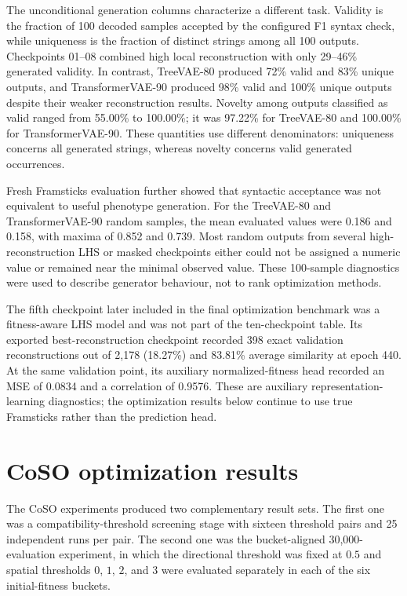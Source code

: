 The unconditional generation columns characterize a different task. Validity is the fraction of 100 decoded samples accepted by the configured F1 syntax check, while uniqueness is the fraction of distinct strings among all 100 outputs. Checkpoints 01--08 combined high local reconstruction with only 29--46\% generated validity. In contrast, TreeVAE-80 produced 72\% valid and 83\% unique outputs, and TransformerVAE-90 produced 98\% valid and 100\% unique outputs despite their weaker reconstruction results. Novelty among outputs classified as valid ranged from 55.00\% to 100.00\%; it was 97.22\% for TreeVAE-80 and 100.00\% for TransformerVAE-90. These quantities use different denominators: uniqueness concerns all generated strings, whereas novelty concerns valid generated occurrences.

Fresh Framsticks evaluation further showed that syntactic acceptance was not equivalent to useful phenotype generation. For the TreeVAE-80 and TransformerVAE-90 random samples, the mean evaluated \vertpos{} values were 0.186 and 0.158, with maxima of 0.852 and 0.739. Most random outputs from several high-reconstruction LHS or masked checkpoints either could not be assigned a numeric value or remained near the minimal observed value. These 100-sample diagnostics were used to describe generator behaviour, not to rank optimization methods.

The fifth checkpoint later included in the final optimization benchmark was a fitness-aware LHS model and was not part of the ten-checkpoint table. Its exported best-reconstruction checkpoint recorded 398 exact validation reconstructions out of 2,178 (18.27\%) and 83.81\% average similarity at epoch 440. At the same validation point, its auxiliary normalized-fitness head recorded an MSE of 0.0834 and a correlation of 0.9576. These are auxiliary representation-learning diagnostics; the optimization results below continue to use true Framsticks \vertpos{} rather than the prediction head.

\section{CoSO optimization results}
\label{sec:CoSO optimization results}

The CoSO experiments produced two complementary result sets. The first one was a compatibility-threshold screening stage with sixteen threshold pairs and 25 independent runs per pair. The second one was the bucket-aligned 30,000-evaluation experiment, in which the directional threshold was fixed at \(0.5\) and spatial thresholds \(0\), \(1\), \(2\), and \(3\) were evaluated separately in each of the six initial-fitness buckets.

